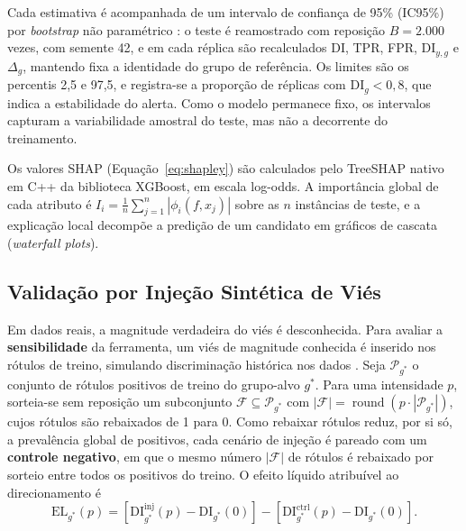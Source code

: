 Cada estimativa é acompanhada de um intervalo de confiança de 95\% (IC95\%) por \textit{bootstrap} não paramétrico \cite{efron1993bootstrap}: o teste é reamostrado com reposição $B = 2.000$ vezes, com semente 42, e em cada réplica são recalculados DI, TPR, FPR, $\mathrm{DI}_{y,g}$ e $\Delta_g$, mantendo fixa a identidade do grupo de referência. Os limites são os percentis 2,5 e 97,5, e registra-se a proporção de réplicas com $\mathrm{DI}_g < 0{,}8$, que indica a estabilidade do alerta. Como o modelo permanece fixo, os intervalos capturam a variabilidade amostral do teste, mas não a decorrente do treinamento.

Os valores SHAP (Equação~\ref{eq:shapley}) são calculados pelo TreeSHAP nativo em C++ da biblioteca XGBoost, em escala log-odds. A importância global de cada atributo é $I_i = \frac{1}{n}\sum_{j=1}^{n} |\phi_i(f, x_j)|$ sobre as $n$ instâncias de teste, e a explicação local decompõe a predição de um candidato em gráficos de cascata (\textit{waterfall plots}).

\subsection{Validação por Injeção Sintética de Viés}
\label{sec:injecao}

Em dados reais, a magnitude verdadeira do viés é desconhecida. Para avaliar a \textbf{sensibilidade} da ferramenta, um viés de magnitude conhecida é inserido nos rótulos de treino, simulando discriminação histórica nos dados \cite{wick2019unlocking}. Seja $\mathcal{P}_{g^{*}}$ o conjunto de rótulos positivos de treino do grupo-alvo $g^{*}$. Para uma intensidade $p$, sorteia-se sem reposição um subconjunto $\mathcal{F} \subseteq \mathcal{P}_{g^{*}}$ com $|\mathcal{F}| = \operatorname{round}(p \cdot |\mathcal{P}_{g^{*}}|)$, cujos rótulos são rebaixados de 1 para 0. Como rebaixar rótulos reduz, por si só, a prevalência global de positivos, cada cenário de injeção é pareado com um \textbf{controle negativo}, em que o mesmo número $|\mathcal{F}|$ de rótulos é rebaixado por sorteio entre todos os positivos do treino. O efeito líquido atribuível ao direcionamento é
\begin{equation}
\mathrm{EL}_{g^{*}}(p) = \left[\mathrm{DI}^{\text{inj}}_{g^{*}}(p) - \mathrm{DI}_{g^{*}}(0)\right] - \left[\mathrm{DI}^{\text{ctrl}}_{g^{*}}(p) - \mathrm{DI}_{g^{*}}(0)\right].
\label{eq:efeito_liquido}
\end{equation}

